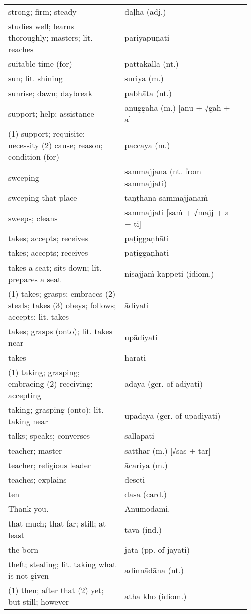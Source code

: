 \documentclass[a5paper]{memoir}
\begin{document}
\begin{longtable}{L{0.48\linewidth} L{0.48\linewidth} H}
strong; firm; steady & daḷha (adj.) & \\
studies well; learns thoroughly; masters; lit. reaches & pariyāpuṇāti & \\
suitable time (for) & pattakalla (nt.) & \\
sun; lit. shining & suriya (m.) & \\
sunrise; dawn; daybreak & pabhāta (nt.) & \\
support; help; assistance & anuggaha (m.) [anu + √gah + a] & \\
(1) support; requisite; necessity (2) cause; reason; condition (for) & paccaya (m.) & \\
sweeping & sammajjana (nt. from sammajjati) & \\
sweeping that place & taṇṭhāna-sammajjanaṁ & \\
sweeps; cleans & sammajjati [saṁ + √majj + a + ti] & \\
takes; accepts; receives & paṭiggaṇhāti & \\
takes; accepts; receives & paṭiggaṇhāti & \\
takes a seat; sits down; lit. prepares a seat & nisajjaṁ kappeti (idiom.) & \\
(1) takes; grasps; embraces (2) steals; takes (3) obeys; follows; accepts; lit. takes & ādiyati & \\
takes; grasps (onto); lit. takes near & upādiyati & \\
takes & harati & \\
(1) taking; grasping; embracing (2) receiving; accepting & ādāya (ger. of ādiyati) & \\
taking; grasping (onto); lit. taking near & upādāya (ger. of upādiyati) & \\
talks; speaks; converses & sallapati & \\
teacher; master & satthar (m.) [√sās + tar] & \\
teacher; religious leader & ācariya (m.) & \\
teaches; explains & deseti & \\
ten & dasa (card.) & \\
Thank you. & Anumodāmi. & \\
that much; that far; still; at least & tāva (ind.) & \\
the born & jāta (pp. of jāyati) & \\
theft; stealing; lit. taking what is not given & adinnādāna (nt.) & \\
(1) then; after that (2) yet; but still; however & atha kho (idiom.) & \\

\end{longtable}
\end{document}
